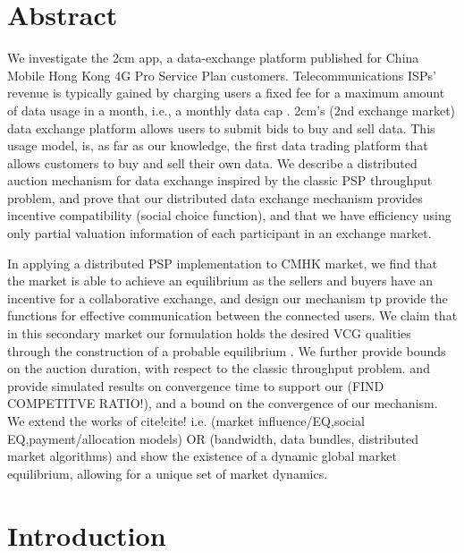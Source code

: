 \documentclass[12pt]{article}
\theoremstyle{definition}
\begin{document}
\begin{multicols}{2}

\section{Abstract}

We investigate the 2cm app, a data-exchange platform published for China Mobile Hong
Kong 4G Pro Service Plan customers. Telecommunications ISPs' revenue is typically
gained by charging users a fixed fee for a maximum amount
of data usage in a month, i.e., a monthly data cap \cite{???}. 
2cm's (2nd exchange market) data exchange platform allows users to submit
bids to buy and sell data.
This usage model, is, as far as our knowledge, the first data trading
platform that allows customers to buy and sell their own data.
We describe a distributed auction mechanism for data exchange inspired by the
classic PSP throughput problem,
and prove that our distributed data exchange mechanism provides incentive
compatibility (social choice function), and that we have efficiency
using only partial valuation information of each participant in an exchange market.

In applying a distributed PSP implementation to CMHK market, we
find that
the market is able to achieve an equilibrium as the sellers and buyers have an
incentive for a collaborative exchange, and design our mechanism tp provide the functions
for effective communication between the connected users. We claim that in
this secondary market our formulation holds the desired VCG qualities through the construction of a
probable equilibrium \cite{???}. We further provide bounds on the auction duration, 
with respect to the classic throughput problem.
and provide simulated results on convergence time to support our (FIND
COMPETITVE RATIO!), and a bound
on the convergence of our mechanism. We extend the works of cite!cite!
i.e. (market influence/EQ,social EQ,payment/allocation models) OR (bandwidth, data bundles, distributed
market algorithms) and show the existence of a dynamic global market equilibrium, allowing for a unique set of market dynamics.



\section{Introduction}


\end{multicols}
\end{document}
